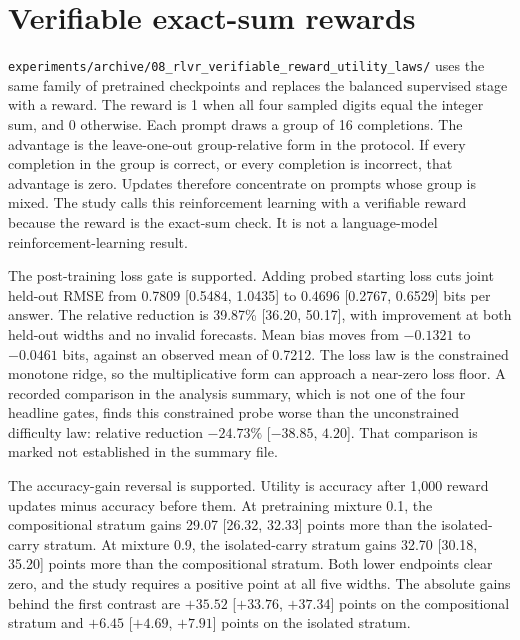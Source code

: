 \section{Verifiable exact-sum rewards}
\label{sec:rlvr}

\texttt{experiments/archive/08\_rlvr\_verifiable\_reward\_utility\_laws/} uses the same family of pretrained checkpoints and replaces the balanced supervised stage with a reward.
The reward is 1 when all four sampled digits equal the integer sum, and 0 otherwise.
Each prompt draws a group of 16 completions.
The advantage is the leave-one-out group-relative form in the protocol.
If every completion in the group is correct, or every completion is incorrect, that advantage is zero.
Updates therefore concentrate on prompts whose group is mixed.
The study calls this reinforcement learning with a verifiable reward because the reward is the exact-sum check.
It is not a language-model reinforcement-learning result.

The post-training loss gate is supported.
Adding probed starting loss cuts joint held-out RMSE from 0.7809 [0.5484, 1.0435] to 0.4696 [0.2767, 0.6529] bits per answer.
The relative reduction is 39.87\% [36.20, 50.17], with improvement at both held-out widths and no invalid forecasts.
Mean bias moves from $-0.1321$ to $-0.0461$ bits, against an observed mean of 0.7212.
The loss law is the constrained monotone ridge, so the multiplicative form can approach a near-zero loss floor.
A recorded comparison in the analysis summary, which is not one of the four headline gates, finds this constrained probe worse than the unconstrained difficulty law: relative reduction $-24.73\%$ [$-38.85$, $4.20$].
That comparison is marked not established in the summary file.

The accuracy-gain reversal is supported.
Utility is accuracy after 1{,}000 reward updates minus accuracy before them.
At pretraining mixture 0.1, the compositional stratum gains 29.07 [26.32, 32.33] points more than the isolated-carry stratum.
At mixture 0.9, the isolated-carry stratum gains 32.70 [30.18, 35.20] points more than the compositional stratum.
Both lower endpoints clear zero, and the study requires a positive point at all five widths.
The absolute gains behind the first contrast are $+35.52$ [$+33.76$, $+37.34$] points on the compositional stratum and $+6.45$ [$+4.69$, $+7.91$] points on the isolated stratum.


